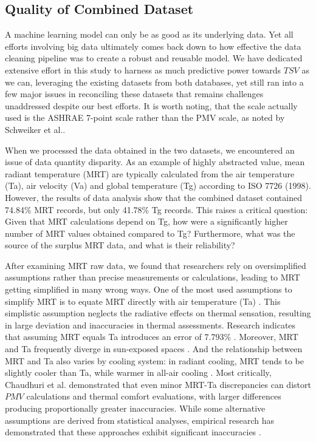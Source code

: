 \subsection{Quality of Combined Dataset}

A machine learning model can only be as good as its underlying data. Yet all efforts involving big data ultimately comes back down to how effective the data cleaning pipeline was to create a robust and reusable model. We have dedicated extensive effort in this study to harness as much predictive power towards $TSV$ as we can, leveraging the existing datasets from both databases, yet still ran into a few major issues in reconciling these datasets that remains challenges unaddressed despite our best efforts. It is worth noting, that the scale actually used is the ASHRAE 7-point scale rather than the PMV scale, as noted by Schweiker et al.\cite{schweiker2017review}.

When we processed the data obtained in the two datasets, we encountered an issue of data quantity disparity. As an example of highly abstracted value, mean radiant temperature (MRT) are typically calculated from the air temperature (Ta), air velocity (Va) and global temperature (Tg) according to ISO 7726 (1998). However, the results of data analysis show that the combined dataset contained 74.84\% MRT records, but only 41.78\% Tg records. This raises a critical question: Given that MRT calculations depend on Tg, how were a significantly higher number of MRT values obtained compared to Tg? Furthermore, what was the source of the surplus MRT data, and what is their reliability?

After examining MRT raw data, we found that researchers rely on oversimplified assumptions rather than precise measurements or calculations, leading to MRT getting simplified in many wrong ways. One of the most used assumptions to simplify MRT is to equate MRT directly with air temperature (Ta) \cite{mouFieldStudyThermal2022,heidariComparativeAnalysisShortterm2002,schiavonDynamicPredictiveClothing2013}. This simplistic assumption neglects the radiative effects on thermal sensation, resulting in large deviation and inaccuracies in thermal assessments. Research indicates that assuming MRT equals Ta introduces an error of 7.793\% \cite{ozbeyComprehensiveComparisonAccuracy2022}. Moreover, MRT and Ta frequently diverge in sun-exposed spaces \cite{walikewitzDifferenceMeanRadiant2015}. And the relationship between MRT and Ta also varies by cooling system: in radiant cooling, MRT tends to be slightly cooler than Ta, while warmer in all-air cooling  \cite{daweComparisonMeanRadiant2020}. Most critically, Chaudhuri et al. \cite{chaudhuriAssumingMeanRadiant2016} demonstrated that even minor MRT-Ta discrepancies can distort $PMV$ calculations and thermal comfort evaluations, with larger differences producing proportionally greater inaccuracies. While some alternative assumptions are derived from statistical analyses, empirical research has demonstrated that these approaches exhibit significant inaccuracies \cite{ozbeyComprehensiveComparisonAccuracy2022}.

